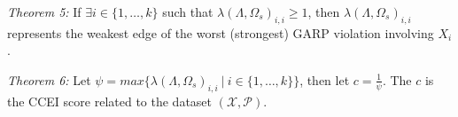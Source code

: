\documentclass{article} %
\begin{document}
\textit{Theorem 5:} If $\exists i\in\{1,\ldots,k\}$ such that $\lambda(\Lambda,\Omega_s)_{i,i}\geq1$, then $\lambda(\Lambda,\Omega_s)_{i,i}$ represents the weakest edge of the worst (strongest) GARP violation involving $X_i$.

\textit{Theorem 6:} Let $\psi = max\big\{\lambda(\Lambda,\Omega_s)_{i,i}\ |\ i\in\{1,\ldots,k\}\big\}$, then let $c=\frac{1}{\psi}$. The $c$ is the CCEI score related to the dataset $(\mathcal{X},\mathcal{P})$.


\end{document}

